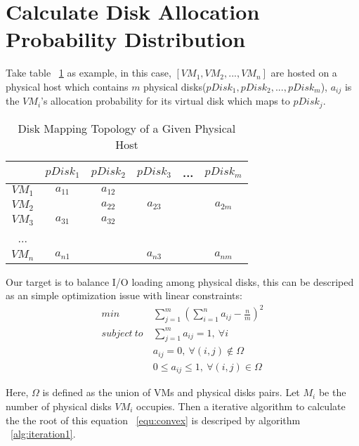 \documentclass[11pt,a4paper]{article}
\begin{document}
\section{\textbf {Calculate Disk Allocation Probability Distribution}}
\label{sec:problem1}

Take table ~\ref{table:topology} as example, in this case, $[VM_1,VM_2,...,VM_n]$ are hosted 
on a physical host which contains $m$ physical disks($pDisk_1,pDisk_2,...,pDisk_m$), 
$a_{ij}$ is the $VM_{i}$'s allocation probability for its virtual disk which maps to $pDisk_j$.

\begin{table}
\centering
\caption{Disk Mapping Topology of a Given Physical Host}
\begin{tabular}{|c|c|c|c|c|c|}
\hline
& $pDisk_1$ & $pDisk_2$ & $pDisk_3$ & ... & $pDisk_m$ \\
\hline
$VM_1$ & $a_{11}$ & $a_{12}$ & & & \\
\hline
$VM_2$ & & $a_{22}$ & $a_{23}$ & & $a_{2m}$ \\
\hline
$VM_3$ & $a_{31}$ & $a_{32}$ & & & \\
\hline
... & & & & & \\
\hline
$VM_n$ & $a_{n1}$ & & $a_{n3}$ & & $a_{nm}$ \\
\hline
\end{tabular}
\label{table:topology}
\end{table}

Our target is to balance I/O loading among physical disks, this can be descriped as 
an simple optimization issue with linear constraints:
\begin{equation}
\begin{split}
  min\ &\sum_{j=1}^{m} (\sum_{i=1}^{n} a_{ij} - \frac{n}{m})^2 \\
  subject\ to\ &\sum_{j=1}^{m} a_{ij} = 1,\ \forall i  \\
           &a_{ij} = 0,\ \forall (i,j) \notin \Omega \\
           &0 \leq a_{ij} \leq 1,\ \forall (i,j) \in \Omega
\end{split}
\label{equ:convex}
\end{equation}

Here, $\Omega$ is defined as the union of VMs and physical disks pairs.
Let $M_{i}$ be the number of physical disks $VM_{i}$ occupies. Then a iterative 
algorithm to calculate the the root of this equation ~\ref{equ:convex}
is descriped by algorithm ~\ref{alg:iteration1}.
\end{document}
